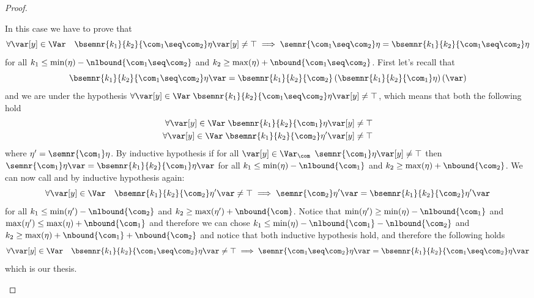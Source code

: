 \begin{proof}
\begin{inductive}
     In this case we have to prove that
    \begin{equation*}
      \forall \var[y]\in\Var \quad \bsemnr{k_1}{k_2}{\com_1\seq\com_2}\eta\var[y] \neq \top
      \implies
      \semnr{\com_1 \seq\com_2} \eta = \bsemnr{k_1}{k_2}{\com_1 \seq\com_2}\eta
    \end{equation*}
    for all \(k_1 \leq \min(\eta) -\nlbound{\com_1\seq\com_2}\) and
    \(k_2 \geq \max(\eta) + \nbound{\com_1\seq\com_2}\). First let's
    recall that
    \begin{equation*}
      \bsemnr{k_1}{k_2}{\com_1\seq\com_2}\eta\var = \bsemnr{k_1}{k_2}{\com_2}\left(\bsemnr{k_1}{k_2}{\com_1}\eta\right)(\var)
    \end{equation*}
    and we are under the hypothesis
    \(\forall \var[y] \in \Var \;
    \bsemnr{k_1}{k_2}{\com_1\seq\com_2}\eta\var[y] \neq \top\), which
    means that both the following hold
    \begin{align*}
      {\forall \var[y] \in \Var} \; \bsemnr{k_1}{k_2}{\com_1}\eta\var[y] & \neq \top \\
      {\forall \var[y] \in \Var} \; \bsemnr{k_1}{k_2}{\com_2}\eta'\var[y] & \neq \top
    \end{align*}
    where \(\eta' = \semnr{\com_1}\eta\).  By inductive hypothesis if
    for all \(\var[y] \in \Var_{\com}\)
    \(\semnr{\com_1}\eta\var[y] \neq \top\) then
    \(\semnr{\com_1}\eta\var = \bsemnr{k_1}{k_2}{\com_1}\eta\var\) for
    all \(k_1 \leq \min(\eta) - \nlbound{\com_1}\) and
    \(k_2 \geq \max(\eta) + \nbound{\com_2}\). We can now call and by
    inductive hypothesis again:
    \begin{equation*}
      \forall \var[y] \in \Var \quad \bsemnr{k_1}{k_2}{\com_2}\eta'\var \neq \top
      \implies
      \semnr{\com_2}\eta'\var = \bsemnr{k_1}{k_2}{\com_2}\eta'\var
    \end{equation*}
    for all \(k_1 \leq \min(\eta') - \nlbound{\com_2}\) and
    \(k_2 \geq \max(\eta') + \nbound{\com}\). Notice that
    \(\min(\eta') \geq \min(\eta) - \nlbound{\com_1}\) and
    \(\max(\eta') \leq \max(\eta) + \nbound{\com_1}\) and therefore we
    can chose
    \(k_1 \leq \min(\eta) - \nlbound{\com_1} - \nlbound{\com_2}\) and
    \(k_2 \geq \max(\eta) + \nbound{\com_1} + \nbound{\com_2}\) and
    notice that both inductive hypothesis hold, and therefore the
    following holds
    \begin{equation*}
      \forall \var[y] \in \Var \quad \bsemnr{k_1}{k_2}{\com_1\seq\com_2}\eta\var \neq \top
      \implies
      \semnr{\com_1\seq\com_2}\eta\var = \bsemnr{k_1}{k_2}{\com_1\seq\com_2}\eta\var
    \end{equation*}
    which is our thesis.
    

\end{inductive}
\end{proof}
